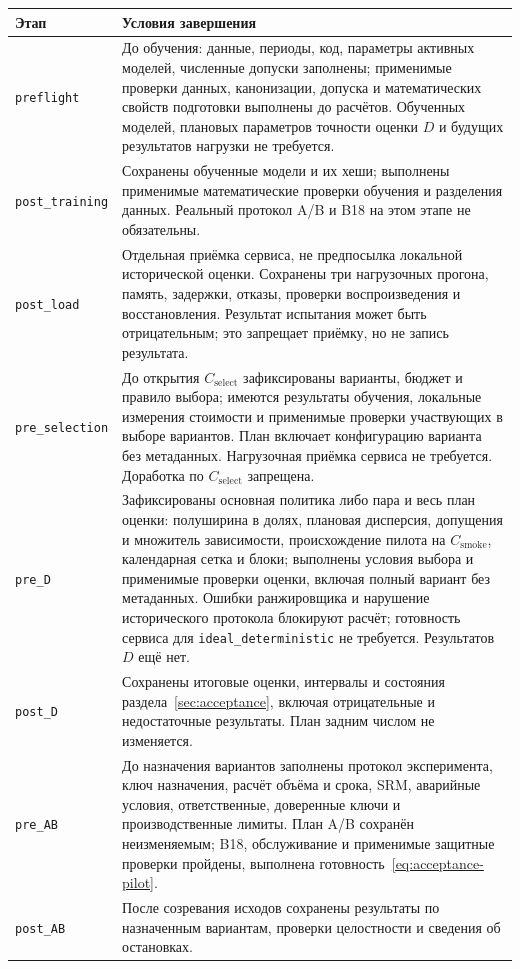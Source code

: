 \documentclass[12pt,a4paper]{article}
\newcommand{\code}[1]{{\ttfamily\small\nolinkurl{#1}}}
\theoremstyle{plainru}
\begin{document}
\begin{longtable}{L{0.18\textwidth}L{0.72\textwidth}}
\toprule Этап & Условия завершения \\\midrule\endhead
\code{preflight} &
До обучения: данные, периоды, код, параметры активных моделей,
численные допуски заполнены; применимые проверки данных, канонизации,
допуска и математических свойств подготовки выполнены до расчётов.
Обученных моделей, плановых параметров точности оценки $D$
и будущих результатов нагрузки не требуется. \\
\code{post_training} &
Сохранены обученные модели и их хеши; выполнены применимые
математические проверки обучения и разделения данных.
Реальный протокол A/B и B18 на этом этапе не обязательны. \\
\code{post_load} &
Отдельная приёмка сервиса, не предпосылка локальной исторической оценки.
Сохранены три нагрузочных прогона, память, задержки, отказы,
проверки воспроизведения и восстановления. Результат испытания
может быть отрицательным; это запрещает приёмку, но не запись результата. \\
\code{pre_selection} &
До открытия $C_{\mathrm{select}}$ зафиксированы варианты, бюджет
и правило выбора; имеются результаты обучения, локальные измерения
стоимости и применимые проверки участвующих в выборе вариантов.
План включает конфигурацию варианта без метаданных.
Нагрузочная приёмка сервиса не требуется.
Доработка по $C_{\mathrm{select}}$ запрещена. \\
\code{pre_D} &
Зафиксированы основная политика либо пара и весь план оценки:
полуширина в долях, плановая дисперсия, допущения и множитель зависимости,
происхождение пилота на $C_{\mathrm{smoke}}$, календарная сетка и блоки;
выполнены условия выбора и применимые проверки оценки, включая
полный вариант без метаданных.
Ошибки ранжировщика и нарушение исторического протокола блокируют расчёт;
готовность сервиса для \code{ideal_deterministic} не требуется.
Результатов $D$ ещё нет. \\
\code{post_D} &
Сохранены итоговые оценки, интервалы и состояния
раздела~\ref{sec:acceptance}, включая отрицательные и недостаточные
результаты. План задним числом не изменяется. \\
\code{pre_AB} &
До назначения вариантов заполнены протокол эксперимента,
ключ назначения, расчёт объёма и срока, SRM, аварийные условия,
ответственные, доверенные ключи и производственные лимиты.
План A/B сохранён неизменяемым; B18, обслуживание и применимые защитные
проверки пройдены, выполнена готовность~\eqref{eq:acceptance-pilot}. \\
\code{post_AB} &
После созревания исходов сохранены результаты по назначенным
вариантам, проверки целостности и сведения об остановках. \\
\bottomrule
\end{longtable}
\end{document}
